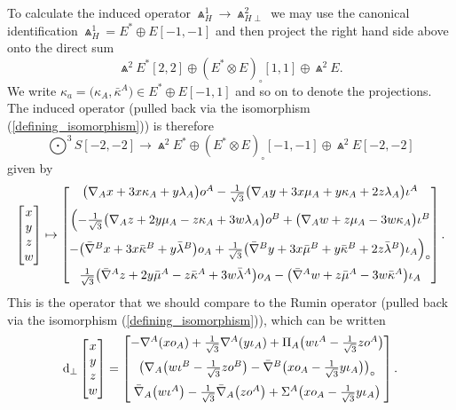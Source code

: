 \documentclass[10pt,a4paper]{amsart}
\numberwithin{equation}{section}
\begin{document}
To calculate the induced operator $\Wedge_H^1 \to \Wedge_{H\perp}^2$ we may use
the canonical identification \mbox{$\Wedge_H^1 = E^* \oplus E[-1,-1]$} and then
project the right hand side above onto the direct sum
\[\Wedge^2E^*[2,2] \oplus (E^* \otimes E)_\circ[1,1] \oplus \Wedge^2E.\]
We write $\kappa_a = \big(\kappa_A, \bar{\kappa}^A\big) \in E^* \oplus E[-1,1]$ and so
on to denote the projections. The induced operator (pulled back via the
isomorphism (\ref{defining_isomorphism})) is therefore
\[\textstyle\bigodot^3\!S[-2,-2] \to \Wedge^2E^*
\oplus (E^* \otimes E)_\circ[-1,-1] \oplus \Wedge^2E[-2,-2]\]
given by
\begin{gather*}
 \begin{bmatrix}
 x \\
 y \\
 z \\
 w
 \end{bmatrix} \mapsto  \begin{bmatrix}
\big(\nabla_{A}x+ 3x\kappa_{A}+ y\lambda_{A}\big)o^{A}
- \frac{1}{\sqrt{3}}\big(\nabla_{A}y + 3x\mu_{A}+ y\kappa_{A}
+ 2z\lambda_{A}\big)\iota^{A} \vspace{2mm}\\
\Big( {-}\frac{1}{\sqrt{3}}\big(\nabla_{A}z + 2y\mu_{A} - z\kappa_{A}
+ 3w\lambda_{A}\big)o^B + \big(\nabla_{A}w + z\mu_{A}
- 3w\kappa_{A}\big)\iota^B \vspace{2mm}\\
- \big(\bar{\nabla}^Bx + 3x\bar{\kappa}^B + y\bar{\lambda}^B\big)o_A
+ \frac{1}{\sqrt{3}}\big(\bar{\nabla}^By + 3x\bar{\mu}^B + y\bar{\kappa}^B
+ 2z\bar{\lambda}^B\big)\iota_A \Big)\rule[-5pt]{0pt}{5pt}_{\circ}\vspace{2mm}\\
\frac{1}{\sqrt{3}}\big(\bar{\nabla}^{A}z + 2y\bar{\mu}^{A} - z\bar{ \kappa}^{A}
+ 3w\bar{\lambda}^{A}\big)o_{A} - \big(\bar{\nabla}^{A}w + z\bar{\mu}^{A}
- 3w\bar{\kappa}^{A}\big)\iota_{A}
\end{bmatrix}.
\end{gather*}
This is the operator that we should compare to the Rumin operator (pulled back
via the isomorphism (\ref{defining_isomorphism})), which can be written
\[{\rm d}_\perp \begin{bmatrix} x \\ y \\z \\w \end{bmatrix} =
\begin{bmatrix}
-\nabla^A(xo_A) + \frac{1}{\sqrt{3}}\nabla^A(y\iota_A)
+\Pi_A\big(w\iota^A-\frac{1}{\sqrt{3}}zo^A\big) \vspace{2mm}\\
\big(\nabla_A\big(w\iota^B-\frac{1}{\sqrt{3}}zo^B\big)
- \bar{\nabla}^B\big(xo_A-\frac{1}{\sqrt{3}}y\iota_A\big)\big)_\circ \vspace{2mm}\\
\bar{\nabla}_A\big(w\iota^A\big) - \frac{1}{\sqrt{3}}\bar{\nabla}_A\big(zo^A\big)
+ \Sigma^A\big(xo_A-\frac{1}{\sqrt{3}}y\iota_A\big)
\end{bmatrix}.\]
\end{document}

